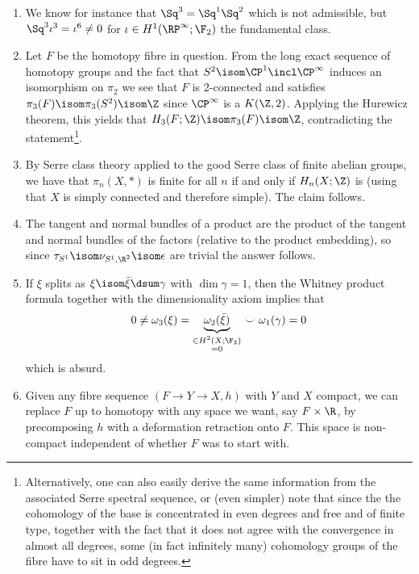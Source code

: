 \begin{answers}
\begin{enumerate}
		\item {} We know for instance that $\Sq^3 = \Sq^1 \Sq^2$ which is not admissible, but $\Sq^3 \iota^3 = \iota^6 \neq 0$ for $\iota \in H^1(\RP^\infty; \F_2)$ the fundamental class.
		\item {} Let $F$ be the homotopy fibre in question.
			From the long exact sequence of homotopy groups and the fact that $S^2 \isom \CP^1 \incl \CP^\infty$ induces an isomorphism on $\pi_2$ we see that $F$ is 2-connected and satisfies $\pi_3(F) \isom \pi_3(S^2) \isom \Z$ since $\CP^\infty$ is a $K(\Z, 2)$.
			Applying the Hurewicz theorem, this yields that $H_3(F; \Z) \isom \pi_3(F) \isom \Z$, contradicting the statement\footnote{Alternatively, one can also easily derive the same information from the associated Serre spectral sequence, or (even simpler) note that since the the cohomology of the base is concentrated in even degrees and free and of finite type, together with the fact that it does not agree with the convergence in almost all degrees, some (in fact infinitely many) cohomology groups of the fibre have to sit in odd degrees.}.
		\item {} By Serre class theory applied to the good Serre class of finite abelian groups, we have that $\pi_n(X, *)$ is finite for all $n$ if and only if $H_n(X; \Z)$ is (using that $X$ is simply connected and therefore simple).
			The claim follows.
		\item {} The tangent and normal bundles of a product are the product of the tangent and normal bundles of the factors (relative to the product embedding), so since $\tau_{S^1} \isom \nu_{S^1, \R^2} \isom \epsilon$ are trivial the answer follows.
		\item {} If $\xi$ splits as $\xi \isom \bar{\xi} \dsum \gamma$ with $\dim \gamma = 1$, then the Whitney product formula together with the dimensionality axiom implies that 
			\begin{equation*}
				0 \neq \omega_3(\xi) = \underbrace{\omega_2(\bar{\xi})}_{\substack{\in H^2(X; \F_2) \\ = 0}} \smile \omega_1(\gamma) = 0
			\end{equation*}
			which is absurd.
		\item {} Given any fibre sequence $(F \to Y \to X, h)$ with $Y$ and $X$ compact, we can replace $F$ up to homotopy with any space we want, say $F \times \R$, by precomposing $h$ with a deformation retraction onto $F$.
			This space is non-compact independent of whether $F$ was to start with.
			\qedhere
	\end{enumerate}
\end{answers}
